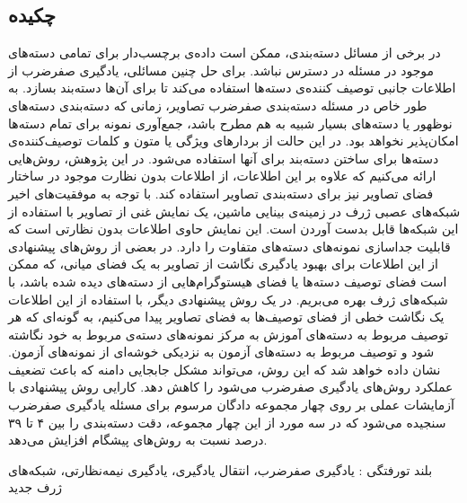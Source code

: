 


\pagestyle{empty}

\subsection*{چکیده}

در برخی از مسائل دسته‌بندی، ممکن است داده‌ی برچسب‌دار برای تمامی دسته‌های موجود در مسئله در دسترس نباشد. برای حل چنین مسائلی، یادگیری صفرضرب از اطلاعات جانبی توصیف کننده‌ی دسته‌ها استفاده می‌کند تا برای آن‌ها دسته‌بند بسازد. به طور خاص در مسئله دسته‌بندی صفرضرب تصاویر، زمانی که دسته‌بندی دسته‌های نوظهور یا دسته‌های بسیار شبیه به هم مطرح باشد، جمع‌آوری نمونه برای تمام دسته‌ها امکان‌پذیر نخواهد بود. در این حالت از بردارهای ویژگی یا متون و کلمات توصیف‌کننده‌ی دسته‌ها برای ساختن دسته‌بند برای آنها استفاده می‌شود. در این پژوهش، روش‌هایی ارائه می‌کنیم که علاوه بر این اطلاعات، از اطلاعات بدون نظارت موجود در ساختار فضای تصاویر نیز برای دسته‌بندی تصاویر استفاده کند. با توجه به موفقیت‌های اخیر شبکه‌های عصبی ژرف در زمینه‌ی بینایی ماشین، یک نمایش غنی از تصاویر با استفاده از این شبکه‌ها قابل بدست آوردن است. این نمایش حاوی اطلاعات بدون نظارتی است که قابلیت جداسازی نمونه‌های دسته‌های متفاوت را دارد. در بعضی از روش‌های پیشنهادی از این اطلاعات برای بهبود یادگیری نگاشت از تصاویر به یک فضای میانی، که ممکن است فضای توصیف دسته‌ها یا فضای هیستوگرام‌هایی از دسته‌های دیده شده باشد،  با شبکه‌های ژرف بهره می‌بریم. در یک روش پیشنهادی دیگر، با استفاده از این اطلاعات یک نگاشت خطی از فضای توصیف‌ها به فضای تصاویر پیدا می‌کنیم، به گونه‌ای که هر توصیف مربوط به دسته‌های آموزش به مرکز نمونه‌های دسته‌ی مربوط به خود نگاشته شود و توصیف مربوط به دسته‌های آزمون به نزدیکی خوشه‌ای از نمونه‌های آزمون. نشان داده خواهد شد که این روش،
می‌تواند مشکل جابجایی دامنه که باعث تضعیف عملکرد روش‌های یادگیری صفرضرب می‌شود را کاهش دهد. کارایی روش پیشنهادی با آزمایشات عملی بر روی چهار مجموعه دادگان مرسوم برای مسئله یادگیری صفرضرب سنجیده می‌شود که در سه مورد از این چهار مجموعه، دقت دسته‌بندی را بین ۴ تا ۳۹ درصد  نسبت به روش‌های پیشگام افزایش می‌دهد.


‌بلند
‌تورفتگی : 
یادگیری صفرضرب، انتقال یادگیری، یادگیری نیمه‌نظارتی، شبکه‌های ژرف
‌جدید
